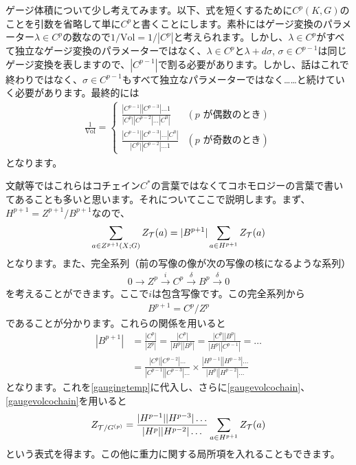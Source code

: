 \documentclass[generalized_symmetry.tex]{subfiles}
\begin{document}
ゲージ体積について少し考えてみます。以下、式を短くするために$C^p(K,G)$のことを引数を省略して単に$C^p$と書くことにします。素朴にはゲージ変換のパラメーター$\lambda \in C^{p}$の数なので$1/\mathrm{Vol} = 1/|C^p|$と考えられます。しかし、$\lambda \in C^p$がすべて独立なゲージ変換のパラメーターではなく、$\lambda\in C^p$と$\lambda+d\sigma$, $\sigma \in C^{p-1}$は同じゲージ変換を表しますので、$|C^{p-1}|$で割る必要があります。しかし、話はこれで終わりではなく、$\sigma \in C^{p-1}$もすべて独立なパラメーターではなく……と続けていく必要があります。最終的には
\begin{align}
  \frac{1}{\mathrm{Vol}} =
  \begin{cases}
    \frac{|C^{p-1}||C^{p-3}|\dots 1}{|C^p||C^{p-2}|\dots |C^0|}  & (p \text{ が偶数のとき}) \\
    \frac{|C^{p-1}||C^{p-3}|\dots |C^0|}{|C^p||C^{p-2}|\dots 1}  & (p \text{ が奇数のとき})  
  \end{cases}
  \label{gaugevolcochain}
\end{align}
となります。

文献等ではこれらはコチェイン$C^*$の言葉ではなくてコホモロジーの言葉で書いてあることも多いと思います。それについてここで説明します。まず、$H^{p+1}=Z^{p+1}/B^{p+1}$なので、
\begin{align}
  \sum_{a \in Z^{p+1}(X;G)} Z_{\mathcal{T}}(a)=|B^{p+1}|\sum_{a \in H^{p+1}} Z_{\mathcal{T}}(a)\label{gaugingtemp}
\end{align}
となります。また、完全系列（前の写像の像が次の写像の核になるような系列）
\begin{align}
  0 \to Z^{p} \overset{i}{\to} C^{p} \overset{\delta}{\to} B^{p} \overset{\delta}{\to} 0 
\end{align}
を考えることができます。ここで$i$は包含写像です。この完全系列から
\begin{align}
  B^{p+1}=C^{p}/Z^{p}
\end{align}
であることが分かります。これらの関係を用いると
\begin{align}
  |B^{p+1}|&=\frac{|C^{p}|}{|Z^{p}|}=\frac{|C^{p}|}{|H^p||B^p|}=\frac{|C^{p}||B^p|}{|H^p||C^{p-1}|}=\dots\\
  &=\frac{|C^{p}||C^{p-2}|\dots }{|C^{p-1}||C^{p-3}|\dots}\times
  \frac{|H^{p-1}||H^{p-3}|\dots }{|H^p||H^{p-2}|\dots } 
\end{align}
となります。これを\eqref{gaugingtemp}に代入し、さらに\eqref{gaugevolcochain}、\eqref{gaugevolcochain}を用いると
\begin{align}
  Z_{\mathcal{T}/G^{(p)}} = \frac{|H^{p-1}||H^{p-3}|\dots }{|H^p||H^{p-2}|\dots } \sum_{a \in H^{p+1}} Z_{\mathcal{T}}(a)
\end{align}
という表式を得ます。この他に重力に関する局所項を入れることもできます。
\end{document}
